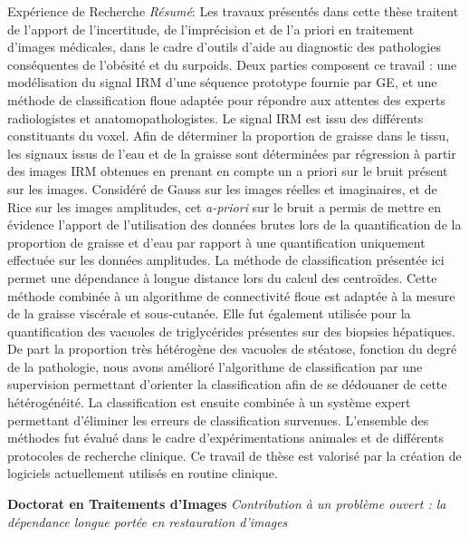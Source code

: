\begin{rubric}{Expérience de Recherche}
  \textit{Résumé}: Les travaux présentés dans cette thèse traitent de
  l’apport de l’incertitude, de l’imprécision et de l’a priori en
  traitement d’images médicales, dans le cadre d’outils d’aide au
  diagnostic des pathologies conséquentes de l’obésité et du
  surpoids. Deux parties composent ce travail : une modélisation du
  signal IRM d’une séquence prototype fournie par GE, et une méthode
  de classification floue adaptée pour répondre aux attentes des
  experts radiologistes et anatomopathologistes. Le signal IRM est
  issu des différents constituants du voxel. Afin de déterminer la
  proportion de graisse dans le tissu, les signaux issus de l’eau et
  de la graisse sont déterminées par régression à partir des images
  IRM obtenues en prenant en compte un a priori sur le bruit présent
  sur les images. Considéré de Gauss sur les images réelles et
  imaginaires, et de Rice sur les images amplitudes, cet \emph{a-priori} sur
  le bruit a permis de mettre en évidence l’apport de l’utilisation
  des données brutes lors de la quantification de la proportion de
  graisse et d’eau par rapport à une quantification uniquement
  effectuée sur les données amplitudes. La méthode de classification
  présentée ici permet une dépendance à longue distance lors du calcul
  des centroïdes. Cette méthode combinée à un algorithme de
  connectivité floue est adaptée à la mesure de la graisse viscérale
  et sous-cutanée. Elle fut également utilisée pour la quantification
  des vacuoles de triglycérides présentes sur des biopsies
  hépatiques. De part la proportion très hétérogène des vacuoles de
  stéatose, fonction du degré de la pathologie, nous avons amélioré
  l’algorithme de classification par une supervision permettant
  d’orienter la classification afin de se dédouaner de cette
  hétérogénéité. La classification est ensuite combinée à un système
  expert permettant d’éliminer les erreurs de classification
  survenues. L’ensemble des méthodes fut évalué dans le cadre
  d’expérimentations animales et de différents protocoles de recherche
  clinique. Ce travail de thèse est valorisé par la création de
  logiciels actuellement utilisés en routine clinique.\newline

  
  \entry*[04-09/2004]
  \textbf{Doctorat en Traitements d'Images}
  \textit{Contribution à un problème ouvert : la dépendance longue portée en restauration d’images} \newline


\end{rubric}
